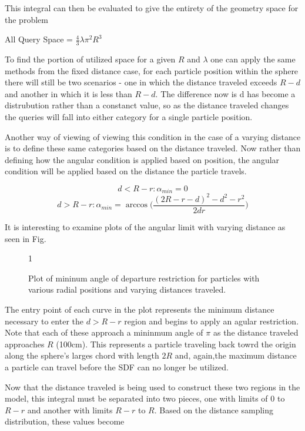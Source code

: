 This integral can then be evaluated to give the entirety of the geometry space
for the problem

\begin{center}
All Query Space = $\frac{4}{3} \lambda \pi^2 R^3$
\end{center}

To find the portion of utilized space for a given $R$ and $\lambda$ one can
apply the same methods from the fixed distance case, for each particle position
within the sphere there will still be two scenarios - one in which the distance
traveled exceeds $R-d$ and another in which it is less than $R-d$. The difference
now is d has become a distrubution rather than a constanct value, so as the
distance traveled changes the queries will fall into either category for a
single particle position.

Another way of viewing of viewing this condition in the case of a varying
distance is to define these same categories based on the distance traveled. Now
rather than defining how the angular condition is applied based on position, the
angular condition will be applied based on the distance the particle travels.

$$ d < R-r : \alpha_{min} = 0 $$
$$ d > R-r : \alpha_{min} = \arccos\Bigg ( \frac{(2R-r-d)^2-d^2-r^2}{2 d r} \Bigg
) $$

It is interesting to examine plots of the angular limit with varying distance as
seen in Fig. \label{fig:alpha_min}

\begin{figure}[ht] \label{fig:alpha_min}

\centering
{1\textwidth}
\caption{Plot of mininum angle of departure restriction for particles with
various radial positions and varying distances traveled.}
\end{figure}

The entry point of each curve in the plot represents the minimum distance
necessary to enter the $d > R-r$ region and begins to apply an agular
restriction. Note that each of these approach a mininmum angle of $\pi$ as the
distance traveled approaches $R$ (100cm). This represents a particle traveling
back towrd the origin along the sphere's larges chord with length $2R$ and,
again,the maximum distance a particle can travel before the SDF can no longer be
utilized.

Now that the distance traveled is being used to construct these two regions in
the model, this integral must be separated into two pieces, one with limits of $0$
to $R-r$ and another with limits $R-r$ to $R$. Based on the distance sampling
distribution, these values become

